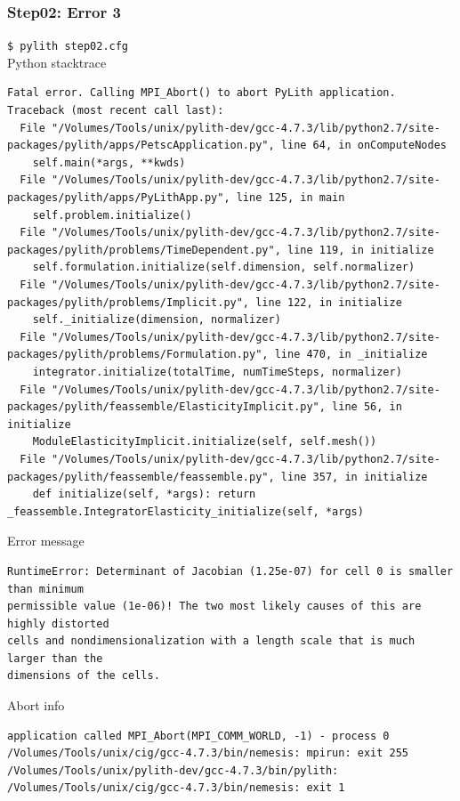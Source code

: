 \documentclass{beamer}
\newcommand{\cmd}[1]{{\tiny\tt \color{ltred}#1}}
\newcommand{\errlabel}[1]{{\small \color{blue}#1}}
\begin{document}
\begin{frame}[fragile]
  \frametitle{Step02: Error 3}

\cmd{\$ pylith step02.cfg}\\
\errlabel{Python stacktrace}
\begin{lstlisting}
Fatal error. Calling MPI_Abort() to abort PyLith application.
Traceback (most recent call last):
  File "/Volumes/Tools/unix/pylith-dev/gcc-4.7.3/lib/python2.7/site-packages/pylith/apps/PetscApplication.py", line 64, in onComputeNodes
    self.main(*args, **kwds)
  File "/Volumes/Tools/unix/pylith-dev/gcc-4.7.3/lib/python2.7/site-packages/pylith/apps/PyLithApp.py", line 125, in main
    self.problem.initialize()
  File "/Volumes/Tools/unix/pylith-dev/gcc-4.7.3/lib/python2.7/site-packages/pylith/problems/TimeDependent.py", line 119, in initialize
    self.formulation.initialize(self.dimension, self.normalizer)
  File "/Volumes/Tools/unix/pylith-dev/gcc-4.7.3/lib/python2.7/site-packages/pylith/problems/Implicit.py", line 122, in initialize
    self._initialize(dimension, normalizer)
  File "/Volumes/Tools/unix/pylith-dev/gcc-4.7.3/lib/python2.7/site-packages/pylith/problems/Formulation.py", line 470, in _initialize
    integrator.initialize(totalTime, numTimeSteps, normalizer)
  File "/Volumes/Tools/unix/pylith-dev/gcc-4.7.3/lib/python2.7/site-packages/pylith/feassemble/ElasticityImplicit.py", line 56, in initialize
    ModuleElasticityImplicit.initialize(self, self.mesh())
  File "/Volumes/Tools/unix/pylith-dev/gcc-4.7.3/lib/python2.7/site-packages/pylith/feassemble/feassemble.py", line 357, in initialize
    def initialize(self, *args): return _feassemble.IntegratorElasticity_initialize(self, *args)
\end{lstlisting}
\errlabel{Error message}
\begin{lstlisting}
RuntimeError: Determinant of Jacobian (1.25e-07) for cell 0 is smaller than minimum
permissible value (1e-06)! The two most likely causes of this are highly distorted
cells and nondimensionalization with a length scale that is much larger than the 
dimensions of the cells.
\end{lstlisting}
\errlabel{Abort info}
\begin{lstlisting}
application called MPI_Abort(MPI_COMM_WORLD, -1) - process 0
/Volumes/Tools/unix/cig/gcc-4.7.3/bin/nemesis: mpirun: exit 255
/Volumes/Tools/unix/pylith-dev/gcc-4.7.3/bin/pylith:
/Volumes/Tools/unix/cig/gcc-4.7.3/bin/nemesis: exit 1
\end{lstlisting}
  
\end{frame}
\end{document}

